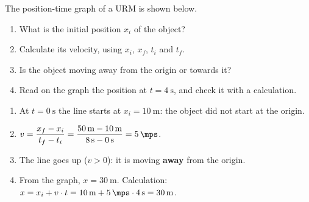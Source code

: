 \begin{exercise}
    The position-time graph of a URM is shown below.
    \begin{center}
    \end{center}
    \begin{enumerate}[label=\letraminuscula]
        \item What is the initial position \(x_i\) of the object?
        \item Calculate its velocity, using \(x_i\), \(x_f\), \(t_i\) and \(t_f\).
        \item Is the object moving away from the origin or towards it?
        \item Read on the graph the position at \(t = \qty{4}{\s}\), and check it with a calculation.
    \end{enumerate}
    \begin{solu}
        \begin{enumerate}[label=\alph*)]
            \item At \(t = \qty{0}{\s}\) the line starts at \(x_i = \qty{10}{\m}\): the object did not start at the origin.
            \item \(v = \dfrac{x_f - x_i}{t_f - t_i} = \dfrac{\qty{50}{\m} - \qty{10}{\m}}{\qty{8}{\s} - \qty{0}{\s}} = \qty{5}{\mps}\).
            \item The line goes up (\(v > 0\)): it is moving \textbf{away} from the origin.
            \item From the graph, \(x = \qty{30}{\m}\). Calculation: \(x = x_i + v \cdot t = \qty{10}{\m} + \qty{5}{\mps} \cdot \qty{4}{\s} = \qty{30}{\m}\).
        \end{enumerate}
    \end{solu}
\end{exercise}


